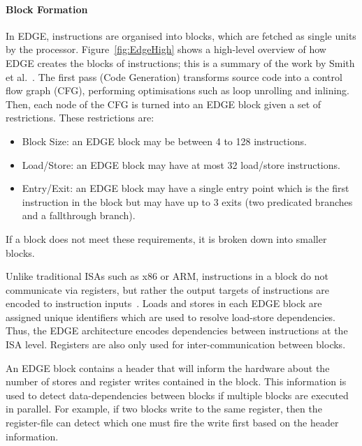 \paragraph*{Block Formation}
In EDGE, instructions are organised into blocks, which are fetched as single units by the processor.
Figure~\ref{fig:EdgeHigh} shows a high-level overview of how EDGE creates the blocks of instructions; this is a summary of the work by Smith et al.~\cite{smith2006edge}. 
The first pass (Code Generation) transforms source code into a control flow graph (CFG), performing optimisations such as loop unrolling and inlining.
Then, each node of the CFG is turned into an EDGE block given a set of restrictions.
These restrictions are:
\begin{itemize}
\item Block Size: an EDGE block may be between 4 to 128 instructions.
\vspace{-1em}
\item Load/Store: an EDGE block may have at most 32 load/store instructions.
\vspace{-1em}
\item Entry/Exit: an EDGE block may have a single entry point which is the first instruction in the block but may have up to 3 exits (two predicated branches and a fallthrough branch).
\end{itemize}
If a block does not meet these requirements, it is broken down into smaller blocks.

Unlike traditional ISAs such as x86 or ARM, instructions in a block do not communicate via registers, but rather the output targets of instructions are encoded to instruction inputs~\cite{smith2006edge}.
Loads and stores in each EDGE block are assigned unique identifiers which are used to resolve load-store dependencies.
Thus, the EDGE architecture encodes dependencies between instructions at the ISA level.
Registers are also only used for inter-communication between blocks.

An EDGE block contains a header that will inform the hardware about the number of stores and register writes contained in the block.
This information is used to detect data-dependencies between blocks if multiple blocks are executed in parallel.
For example, if two blocks write to the same register, then the register-file can detect which one must fire the write first based on the header information. 

